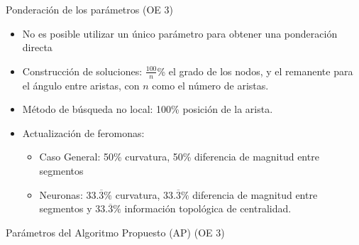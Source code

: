 \begin{frame}{Ponderaci\'on de los par\'ametros (OE 3)}

    \begin{itemize}%
    \item No es posible utilizar un \'unico par\'ametro para obtener una ponderaci\'on directa
    \item Construcci\'on de soluciones: $\frac{100}{n}$\% el grado de los nodos, y el remanente para el \'angulo entre aristas, con $n$ como el n\'umero de aristas.
    \item M\'etodo de b\'usqueda no local: 100\% posici\'on de la arista.
    \item Actualizaci\'on de feromonas: 
    \begin{itemize}%
        \item Caso General: 50\% curvatura, 50\% diferencia de magnitud entre segmentos
        \item Neuronas: $33.\overline{3}\%$ curvatura, $33.\overline{3}\%$ diferencia de magnitud entre segmentos y $33.\overline{3}\%$ informaci\'on topol\'ogica de centralidad.
    \end{itemize}
\end{itemize}
\end{frame}

\begin{frame}{Par\'ametros del Algoritmo Propuesto (AP) (OE 3)}
    \centering
\end{frame}


